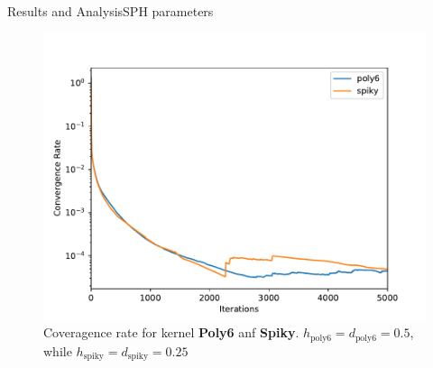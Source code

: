 \documentclass{beamer}
\begin{document}
\begin{frame}{Results and Analysis}{SPH parameters}
\begin{figure}[!ht]{}
        \centering
        \includegraphics[scale=0.4]{../report/Figures/kerneltest.pdf}
        \caption{Coveragence rate for kernel \textbf{Poly6} anf \textbf{Spiky}. $h_\text{poly6} = d_\text{poly6} = 0.5$, while $h_\text{spiky} = d_\text{spiky} = 0.25$}
\end{figure}
\end{frame}
\end{document}
